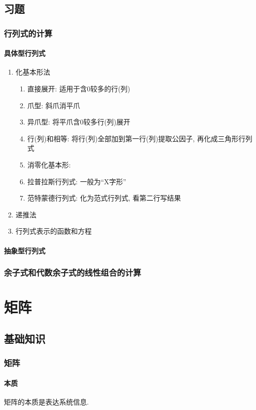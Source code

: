 \section{习题}
\subsection{行列式的计算}
\subsubsection{具体型行列式}
\begin{enumerate}
	\item 化基本形法
	\begin{enumerate}
		\item 直接展开: 适用于含$ 0 $较多的行(列)
		\item 爪型: 斜爪消平爪
		\item 异爪型: 将平爪含$ 0 $较多行(列)展开
		\item 行(列)和相等: 将行(列)全部加到第一行(列)提取公因子, 再化成三角形行列式
		\item 消零化基本形: 
		\item 拉普拉斯行列式: 一般为``X字形''
		\item 范特蒙德行列式: 化为范式行列式, 看第二行写结果
	\end{enumerate}
	\item 递推法
	\item 行列式表示的函数和方程
\end{enumerate}
\subsubsection{抽象型行列式}
\subsection{余子式和代数余子式的线性组合的计算}
\chapter{矩阵}
\section{基础知识}
\subsection{矩阵}
\subsubsection{本质}
矩阵的本质是表达系统信息.
